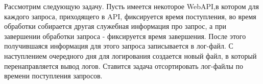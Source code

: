 Рассмотрим следующую задачу. Пусть имеется некоторое WebAPI,в котором для каждого запроса, приходящего в API, фиксируется время поступления, во время обработки собирается другая служебная информация про запрос, а при завершении обработки запроса - фиксируется время завершения. После этого получившаяся информация для  этого запроса записывается в лог-файл. С наступлением очередного дня для логирования создается новый файл, в который перенаправляется вывод логов. Ставится задача отсортировать лог-файлы по времени поступления запросов.